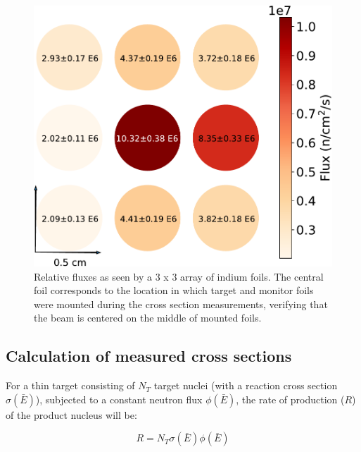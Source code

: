 \documentclass[5p]{elsarticle}
\newcommand{\pp}[1]{\left( #1\right)}
\newcommand{\comment}[1]{\todo[color=blue!20!white,inline]{ASV: #1}}
\begin{document}
\begin{figure}
 \centering
 \includegraphics[scale=0.55]{./figures/fig1_cropped.pdf}
 \caption{Relative fluxes as seen by a 3 x 3 array of indium foils. The central foil corresponds to the location in which target and monitor foils were mounted during the cross section measurements, verifying that the beam is centered on the middle of mounted foils.}
 \label{fig:in_heat_plot}
\end{figure}








\subsection{Calculation of measured cross sections}\label{sec:calcs_sec}


For a thin target consisting of \(N_T\) target nuclei (with a reaction cross section $\sigma\pp{\bar{E}}$), subjected to a constant neutron flux $\phi\pp{\bar{E}}$, the rate of production ($R$) of the product nucleus will be:

\begin{equation}
R = N_T \sigma\pp{\bar{E}} \phi\pp{\bar{E}} 
\end{equation}
\end{document}
